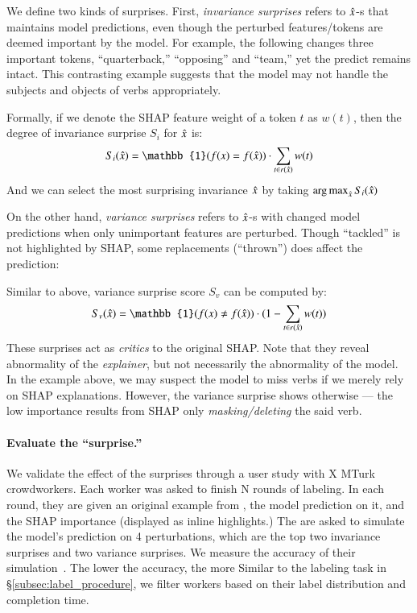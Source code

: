 We define two kinds of surprises.
First, \emph{invariance surprises} refers to $\hat{x}$-s that maintains model predictions, even though the perturbed features/tokens are deemed important by the model.
For example, the following changes three important tokens, ``quarterback,'' ``opposing'' and ``team,'' yet the predict remains intact. This contrasting example suggests that the model may not handle the subjects and objects of verbs appropriately.


Formally, if we denote the SHAP feature weight of a token $t$ as $w(t)$, then the degree of invariance surprise $S_i$ for $\hat{x}$ is: 
$$S_i(\xp) = \mathbb{1}(f(x) = f(\xp)) \cdot \sum_{t \in r(\xp)} w(t) $$
And we can select the most surprising invariance $\hat{x}$ by taking $\operatorname*{arg\,max}_{\hat{x}} S_i(\hat{x})$

On the other hand, \emph{variance surprises} refers to $\hat{x}$-s with changed model predictions when only unimportant features are perturbed.
Though ``tackled'' is not highlighted by SHAP, some replacements (\eg ``thrown'') does affect the prediction:


Similar to above, variance surprise score $S_v$ can be computed by:
$$S_v(\xp) = \mathbb{1}(f(x) \not\eq f(\xp)) \cdot (1-\sum_{t \in r(\xp)} w(t)) $$
These surprises act as \emph{critics} to the original SHAP.
Note that they reveal abnormality of the \emph{explainer}, but not necessarily the abnormality of the model.
In the example above, we may suspect the model to miss verbs if we merely rely on SHAP explanations. However, the variance surprise shows otherwise --- the low importance results from SHAP only \emph{masking/deleting} the said verb.



\paragraph{Evaluate the ``surprise.''}
We validate the effect of the surprises through a user study with X MTurk crowdworkers.
Each worker was asked to finish N rounds of labeling.
In each round, they are given an original example from \dnli, the model prediction on it, and the SHAP importance (displayed as inline highlights.)
The are asked to simulate the model's prediction on 4 perturbations, which are the top two invariance surprises and two variance surprises.
We measure the accuracy of their simulation~\cite{hase2020evaluating}. 
The lower the accuracy, the more 
Similar to the labeling task in \S\ref{subsec:label_procedure}, we filter workers based on their label distribution and completion time.

